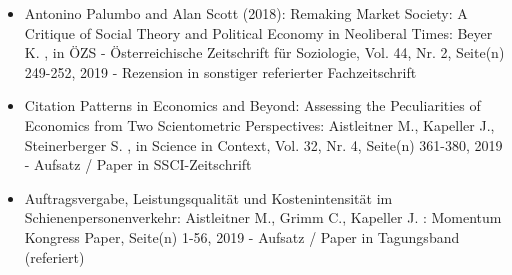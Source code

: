 \begin{itemize}
	 \item Antonino Palumbo and Alan Scott (2018): Remaking Market Society: A Critique of Social Theory and Political Economy in Neoliberal Times: Beyer K. , in ÖZS - Österreichische Zeitschrift für Soziologie, Vol. 44, Nr. 2, Seite(n) 249-252, 2019 - Rezension in sonstiger referierter Fachzeitschrift
	 \item Citation Patterns in Economics and Beyond: Assessing the Peculiarities of Economics from Two Scientometric Perspectives: Aistleitner M., Kapeller J., Steinerberger S. , in Science in Context, Vol. 32, Nr. 4, Seite(n) 361-380, 2019 - Aufsatz / Paper in SSCI-Zeitschrift
	 \item Auftragsvergabe, Leistungsqualität und Kostenintensität im Schienenpersonenverkehr: Aistleitner M., Grimm C., Kapeller J. : Momentum Kongress Paper, Seite(n) 1-56, 2019 - Aufsatz / Paper in Tagungsband (referiert)
\end{itemize} 
